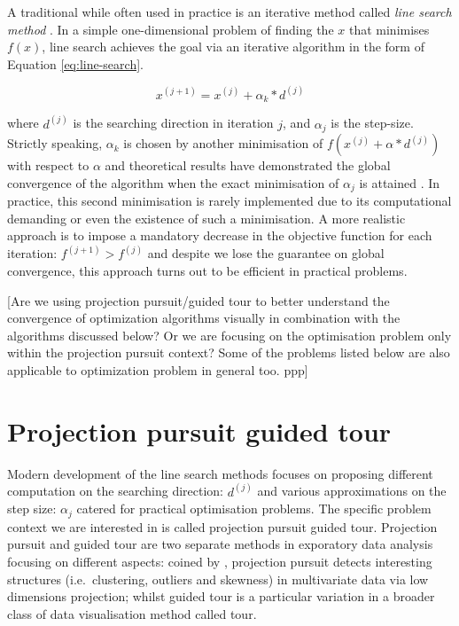\documentclass[12pt]{article}
\begin{document}
A traditional while often used in practice is an iterative method called
\emph{line search method} \citep{fletcher2013practical}. In a simple
one-dimensional problem of finding the \(x\) that minimises \(f(x)\),
line search achieves the goal via an iterative algorithm in the form of
Equation \ref{eq:line-search}.

\begin{equation}
x^{(j + 1)} = x^{(j)} + \alpha_k* d^{(j)}
\label{eq:line-search}
\end{equation}

where \(d^{(j)}\) is the searching direction in iteration \(j\), and
\(\alpha_j\) is the step-size. Strictly speaking, \(\alpha_k\) is chosen
by another minimisation of \(f(x^{(j)} + \alpha* d^{(j)})\) with respect
to \(\alpha\) and theoretical results have demonstrated the global
convergence of the algorithm when the exact minimisation of \(\alpha_j\)
is attained \citep{curry1944method}. In practice, this second
minimisation is rarely implemented due to its computational demanding or
even the existence of such a minimisation. A more realistic approach is
to impose a mandatory decrease in the objective function for each
iteration: \(f^{(j+1)}> f^{(j)}\) and despite we lose the guarantee on
global convergence, this approach turns out to be efficient in practical
problems.

{[}Are we using projection pursuit/guided tour to better understand the
convergence of optimization algorithms visually in combination with the
algorithms discussed below? Or we are focusing on the optimisation
problem only within the projection pursuit context? Some of the problems
listed below are also applicable to optimization problem in general too.
ppp{]}

\newpage

\hypertarget{tour}{%
\section{Projection pursuit guided tour}\label{tour}}

Modern development of the line search methods focuses on proposing
different computation on the searching direction: \(d^{(j)}\) and
various approximations on the step size: \(\alpha_j\) catered for
practical optimisation problems. The specific problem context we are
interested in is called projection pursuit guided tour. Projection
pursuit and guided tour are two separate methods in exporatory data
analysis focusing on different aspects: coined by
\citet{friedman1974projection}, projection pursuit detects interesting
structures (i.e.~clustering, outliers and skewness) in multivariate data
via low dimensions projection; whilst guided tour is a particular
variation in a broader class of data visualisation method called tour.
\end{document}
